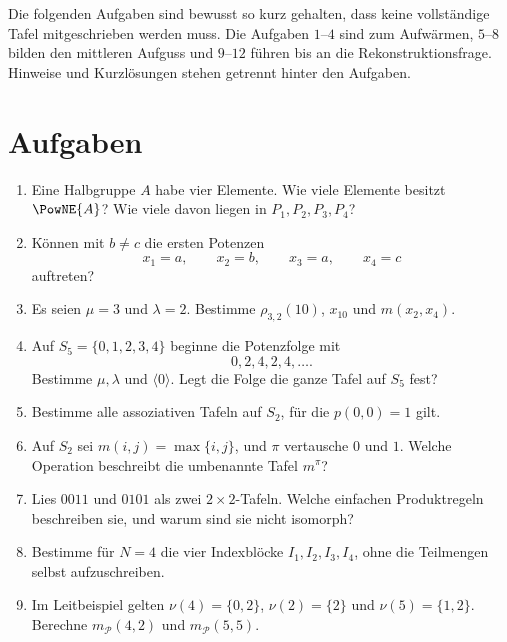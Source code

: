\documentclass[main.tex]{subfiles}
\begin{document}
Die folgenden Aufgaben sind bewusst so kurz gehalten, dass keine vollständige
Tafel mitgeschrieben werden muss.  Die Aufgaben \(1\)--\(4\) sind zum
Aufwärmen, \(5\)--\(8\) bilden den mittleren Aufguss und \(9\)--\(12\) führen
bis an die Rekonstruktionsfrage.  Hinweise und Kurzlösungen stehen getrennt
hinter den Aufgaben.

\section{Aufgaben}

\begin{enumerate}
  \item Eine Halbgruppe \(A\) habe vier Elemente.  Wie viele Elemente besitzt
    \(\PowNE{A}\)?  Wie viele davon liegen in \(P_1,P_2,P_3,P_4\)?

  \item Können mit \(b\neq c\) die ersten Potenzen
    \[
      x_1=a,\qquad x_2=b,\qquad x_3=a,\qquad x_4=c
    \]
    auftreten?

  \item Es seien \(\mu=3\) und \(\lambda=2\).  Bestimme
    \(\rho_{3,2}(10)\), \(x_{10}\) und \(m(x_2,x_4)\).

  \item Auf \(S_5=\{0,1,2,3,4\}\) beginne die Potenzfolge mit
    \[
      0,2,4,2,4,\ldots.
    \]
    Bestimme \(\mu,\lambda\) und \(\langle0\rangle\).  Legt die Folge die
    ganze Tafel auf \(S_5\) fest?

  \item Bestimme alle assoziativen Tafeln auf \(S_2\), für die
    \(p(0,0)=1\) gilt.

  \item Auf \(S_2\) sei \(m(i,j)=\max\{i,j\}\), und \(\pi\) vertausche
    \(0\) und \(1\).  Welche Operation beschreibt die umbenannte Tafel
    \(m^\pi\)?

  \item Lies \(0011\) und \(0101\) als zwei \(2\times2\)-Tafeln.  Welche
    einfachen Produktregeln beschreiben sie, und warum sind sie nicht
    isomorph?

  \item Bestimme für \(N=4\) die vier Indexblöcke
    \(I_1,I_2,I_3,I_4\), ohne die Teilmengen selbst aufzuschreiben.

  \item Im Leitbeispiel gelten
    \(\nu(4)=\{0,2\}\), \(\nu(2)=\{2\}\) und
    \(\nu(5)=\{1,2\}\).  Berechne \(m_{\mathcal P}(4,2)\) und
    \(m_{\mathcal P}(5,5)\).


\end{enumerate}
\end{document}
